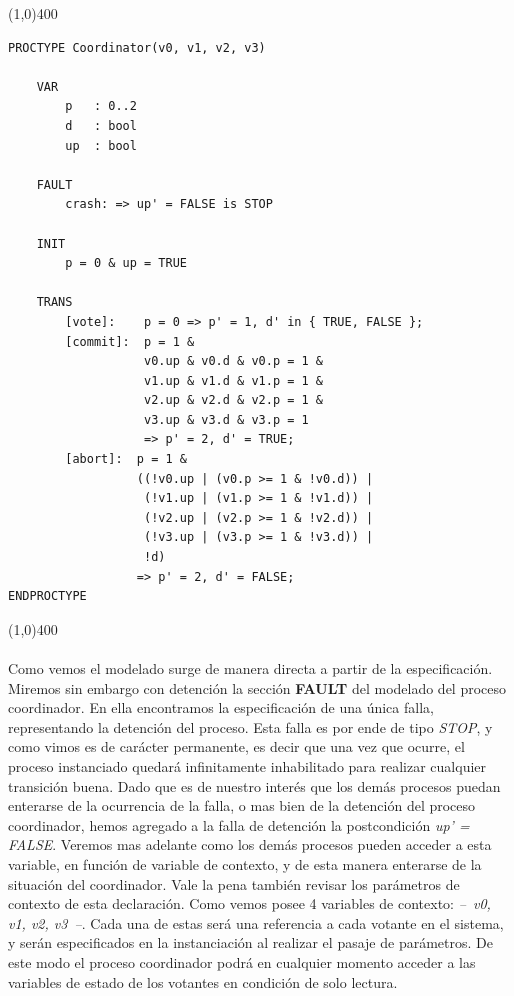 \documentclass[titlepage, 12pt]{book}
\begin{document}
\noindent \line(1,0){400}
\begin{verbatim}
PROCTYPE Coordinator(v0, v1, v2, v3)

    VAR
        p   : 0..2
        d   : bool
        up  : bool
    
    FAULT 
        crash: => up' = FALSE is STOP

    INIT
        p = 0 & up = TRUE

    TRANS
        [vote]:    p = 0 => p' = 1, d' in { TRUE, FALSE };
        [commit]:  p = 1 &
                   v0.up & v0.d & v0.p = 1 &
                   v1.up & v1.d & v1.p = 1 &
                   v2.up & v2.d & v2.p = 1 &
                   v3.up & v3.d & v3.p = 1 
                   => p' = 2, d' = TRUE;
        [abort]:  p = 1 &
                  ((!v0.up | (v0.p >= 1 & !v0.d)) |
                   (!v1.up | (v1.p >= 1 & !v1.d)) |
                   (!v2.up | (v2.p >= 1 & !v2.d)) |
                   (!v3.up | (v3.p >= 1 & !v3.d)) |
                   !d)
                  => p' = 2, d' = FALSE;
ENDPROCTYPE
\end{verbatim}
\line(1,0){400}
~\\\\

Como vemos el modelado surge de manera directa a partir de la especificación. Miremos sin embargo con detención la sección \textbf{FAULT} del modelado del proceso coordinador. En ella encontramos la especificación de una única falla, representando la detención del proceso. Esta falla es por ende de tipo \textit{STOP}, y como vimos es de carácter permanente, es decir que una vez que ocurre, el proceso instanciado quedará infinitamente inhabilitado para realizar cualquier transición buena. Dado que es de nuestro interés que los demás procesos puedan enterarse de la ocurrencia de la falla, o mas bien de la detención del proceso coordinador, hemos agregado a la falla de detención la postcondición \textit{up' = FALSE}. Veremos mas adelante como los demás procesos pueden acceder a esta variable, en función de variable de contexto, y de esta manera enterarse de la situación del coordinador. Vale la pena también revisar los parámetros de contexto de esta declaración. Como vemos posee 4 variables de contexto: \textit{--~v0, v1, v2, v3~--}. Cada una de estas será una referencia a cada votante en el sistema, y serán especificados en la instanciación al realizar el pasaje de parámetros. De este modo el proceso coordinador podrá en cualquier momento acceder a las variables de estado de los votantes en condición de solo lectura.\\
\end{document}
